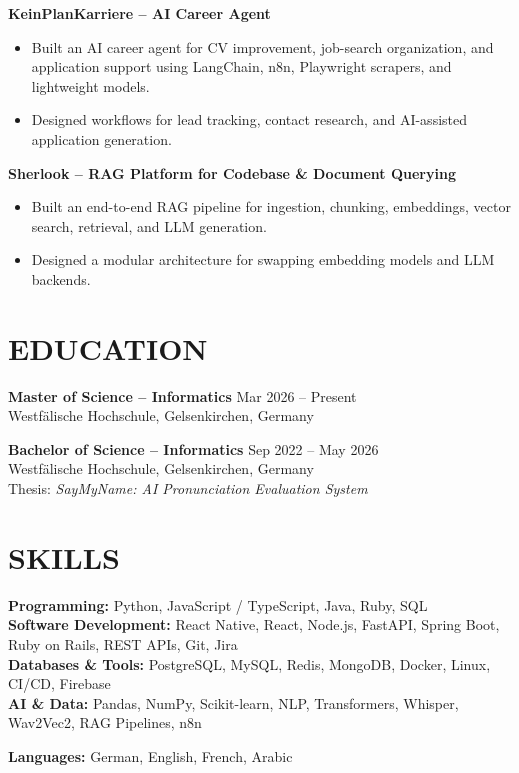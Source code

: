 \documentclass[a4paper,10pt]{article}
\begin{document}
\textbf{KeinPlanKarriere -- AI Career Agent}
\begin{itemize}
\item Built an AI career agent for CV improvement, job-search organization, and application support using LangChain, n8n, Playwright scrapers, and lightweight models.
\item Designed workflows for lead tracking, contact research, and AI-assisted application generation.
\end{itemize}

\textbf{Sherlook -- RAG Platform for Codebase \& Document Querying}
\begin{itemize}
\item Built an end-to-end RAG pipeline for ingestion, chunking, embeddings, vector search, retrieval, and LLM generation.
\item Designed a modular architecture for swapping embedding models and LLM backends.
\end{itemize}

\section*{EDUCATION}

\textbf{Master of Science -- Informatics} \hfill Mar 2026 -- Present \\
Westfälische Hochschule, Gelsenkirchen, Germany

\textbf{Bachelor of Science -- Informatics} \hfill Sep 2022 -- May 2026 \\
Westfälische Hochschule, Gelsenkirchen, Germany \\
Thesis: \textit{SayMyName: AI Pronunciation Evaluation System}

\section*{SKILLS}

\textbf{Programming:} Python, JavaScript / TypeScript, Java, Ruby, SQL \\
\textbf{Software Development:} React Native, React, Node.js, FastAPI, Spring Boot, Ruby on Rails, REST APIs, Git, Jira \\
\textbf{Databases \& Tools:} PostgreSQL, MySQL, Redis, MongoDB, Docker, Linux, CI/CD, Firebase \\
\textbf{AI \& Data:} Pandas, NumPy, Scikit-learn, NLP, Transformers, Whisper, Wav2Vec2, RAG Pipelines, n8n

\textbf{Languages:} German, English, French, Arabic
\end{document}
